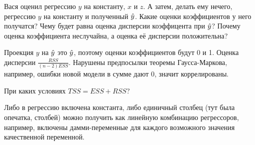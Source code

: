 \begin{problem}
Вася оценил регрессию $y$ на константу, $x$ и $z$. А затем, делать ему нечего, регрессию $y$ на константу и полученный $\hat{y}$. Какие оценки коэффициентов у него получатся? Чему будет равна оценка дисперсии коэффицента при $\hat{y}$? Почему оценка коэффициента неслучайна, а оценка её дисперсии положительна?


\begin{sol}
Проекция $y$ на $\hat{y}$ это $\hat{y}$, поэтому оценки коэффициентов будут 0 и 1. Оценка дисперсии $\frac{RSS}{(n-2)ESS}$. Нарушены предпосылки теоремы Гаусса-Маркова, например, ошибки новой модели в сумме дают 0, значит коррелированы.
\end{sol}
\end{problem}




\begin{problem}
При каких условиях $TSS=ESS+RSS$?

\begin{sol}
Либо в регрессию включена константа, либо единичный столбец (тут была опечатка, столбей) можно получить как линейную комбинацию регрессоров, например, включены дамми-переменные для каждого возможного значения качественной переменной.
\end{sol}
\end{problem}


